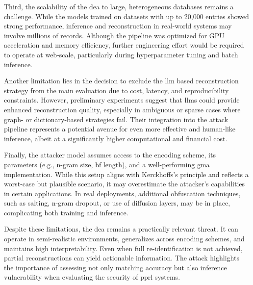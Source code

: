 Third, the scalability of the \ac{dea} to large, heterogeneous databases remains a challenge.
While the models trained on datasets with up to 20{,}000 entries showed strong performance, inference and reconstruction in real-world systems may involve millions of records.
Although the pipeline was optimized for GPU acceleration and memory efficiency, further engineering effort would be required to operate at web-scale, particularly during hyperparameter tuning and batch inference.

Another limitation lies in the decision to exclude the \ac{llm} based reconstruction strategy from the main evaluation due to cost, latency, and reproducibility constraints.
However, preliminary experiments suggest that \ac{llm}s could provide enhanced reconstruction quality, especially in ambiguous or sparse cases where graph- or dictionary-based strategies fail.
Their integration into the attack pipeline represents a potential avenue for even more effective and human-like inference, albeit at a significantly higher computational and financial cost.

Finally, the attacker model assumes access to the encoding scheme, its parameters (e.g., n-gram size, \ac{bf} length), and a well-performing \ac{gma} implementation.
While this setup aligns with Kerckhoffs's principle and reflects a worst-case but plausible scenario, it may overestimate the attacker's capabilities in certain applications.
In real deployments, additional obfuscation techniques, such as salting, n-gram dropout, or use of diffusion layers, may be in place, complicating both training and inference.

Despite these limitations, the \ac{dea} remains a practically relevant threat.
It can operate in semi-realistic environments, generalizes across encoding schemes, and maintains high interpretability.
Even when full re-identification is not achieved, partial reconstructions can yield actionable information.
The attack highlights the importance of assessing not only matching accuracy but also inference vulnerability when evaluating the security of \ac{pprl} systems.